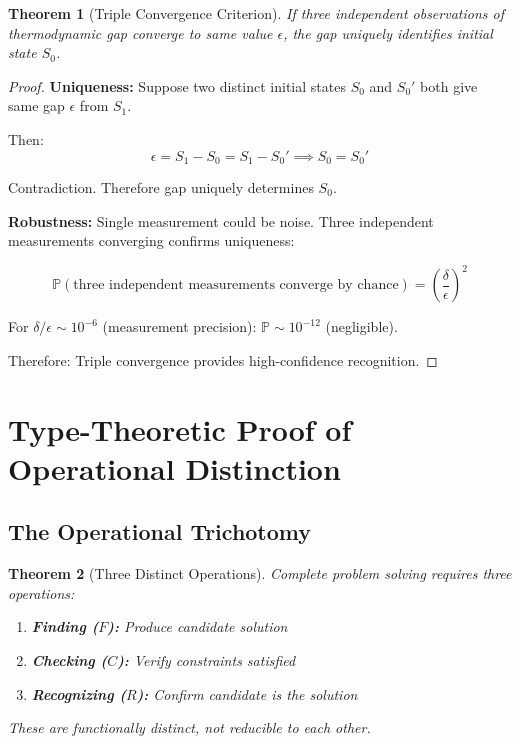 \documentclass[twocolumn,10pt]{revtex4-2}
\newtheorem{theorem}{Theorem}[section]
\theoremstyle{definition}
\theoremstyle{remark}
\begin{document}
\begin{theorem}[Triple Convergence Criterion]
\label{thm:triple_convergence}
If three independent observations of thermodynamic gap converge to same value $\epsilon$, the gap uniquely identifies initial state $S_0$.
\end{theorem}

\begin{proof}
\textbf{Uniqueness:} Suppose two distinct initial states $S_0$ and $S_0'$ both give same gap $\epsilon$ from $S_1$.

Then:
\begin{equation}
\epsilon = S_1 - S_0 = S_1 - S_0' \implies S_0 = S_0'
\end{equation}

Contradiction. Therefore gap uniquely determines $S_0$.

\vspace{0.2cm}
\noindent\textbf{Robustness:} Single measurement could be noise. Three independent measurements converging confirms uniqueness:

\begin{equation}
\mathbb{P}(\text{three independent measurements converge by chance}) = \left(\frac{\delta}{\epsilon}\right)^2
\end{equation}

For $\delta/\epsilon \sim 10^{-6}$ (measurement precision): $\mathbb{P} \sim 10^{-12}$ (negligible).

Therefore: Triple convergence provides high-confidence recognition.
\end{proof}

\section{Type-Theoretic Proof of Operational Distinction}
\label{sec:type_theory}

\subsection{The Operational Trichotomy}

\begin{theorem}[Three Distinct Operations]
\label{thm:operational_trichotomy}
Complete problem solving requires three operations:
\begin{enumerate}
\item \textbf{Finding ($F$):} Produce candidate solution
\item \textbf{Checking ($C$):} Verify constraints satisfied
\item \textbf{Recognizing ($R$):} Confirm candidate is the solution
\end{enumerate}
These are functionally distinct, not reducible to each other.
\end{theorem}
\end{document}
